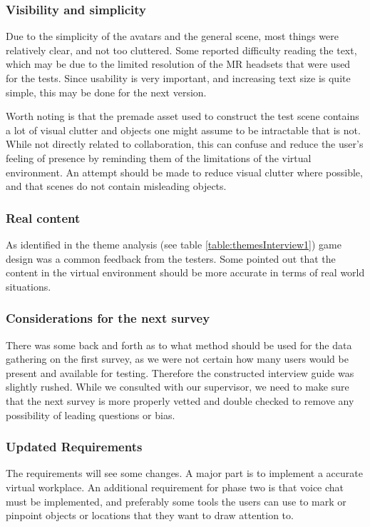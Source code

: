 \subsubsection{Visibility and simplicity}
Due to the simplicity of the avatars and the general scene, most things were relatively clear, and not too cluttered. Some reported difficulty reading the text, which may be due to the limited resolution of the MR headsets that were used for the tests. Since usability is very important, and increasing text size is quite simple, this may be done for the next version.

Worth noting is that the premade asset used to construct the test scene contains a lot of visual clutter and objects one might assume to be intractable that is not. While not directly related to collaboration, this can confuse and reduce the user's feeling of presence by reminding them of the limitations of the virtual environment. An attempt should be made to reduce visual clutter where possible, and that scenes do not contain misleading objects.

\subsubsection{Real content}
As identified in the theme analysis (see table \ref{table:themesInterview1}) game design was a common feedback from the testers. Some pointed out that the content in the virtual environment should be more accurate in terms of real world situations.      

\subsubsection{Considerations for the next survey}
There was some back and forth as to what method should be used for the data gathering on the first survey, as we were not certain how many users would be present and available for testing. Therefore the constructed interview guide was slightly rushed. While we consulted with our supervisor, we need to make sure that the next survey is more properly vetted and double checked to remove any possibility of leading questions or bias. 

\subsubsection{Updated Requirements}
The requirements will see some changes. A major part is to implement a accurate virtual workplace.  An additional requirement for phase two is that voice chat must be implemented, and preferably some tools the users can use to mark or pinpoint objects or locations that they want to draw attention to.



\cleardoublepage